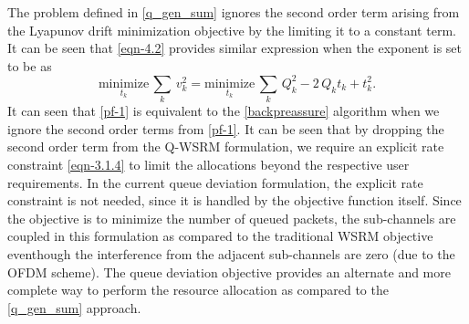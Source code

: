 
The problem defined in \eqref{q_gen_sum} ignores the second order term arising from the Lyapunov drift minimization objective by the limiting it to a constant term. It can be seen that \eqref{eqn-4.2} provides similar expression when the exponent is set to be  as
\begin{equation}\label{pf-1}
\underset{t_k}{\text{minimize}} \, \sum_k \, v_k^2 = \underset{t_k}{\text{minimize}} \, \sum_k \, Q_k^2 - 2 \, Q_k t_k + t_k^2.
\end{equation}
It can seen that \eqref{pf-1} is equivalent to the \eqref{backpreassure} algorithm when we ignore the second order terms from \eqref{pf-1}. It can be seen that by dropping the second order term from the \ac{Q-WSRM} formulation, we require an explicit rate constraint \eqref{eqn-3.1.4} to limit the allocations beyond the respective user requirements. In the current queue deviation formulation, the explicit rate constraint is not needed, since it is handled by the objective function itself. Since the objective is to minimize the number of queued packets, the sub-channels are coupled in this formulation as compared to the traditional \ac{WSRM} objective eventhough the interference from the adjacent sub-channels are zero (due to the \ac{OFDM} scheme). The queue deviation objective provides an alternate and more complete way to perform the resource allocation as compared to the \eqref{q_gen_sum} approach.

